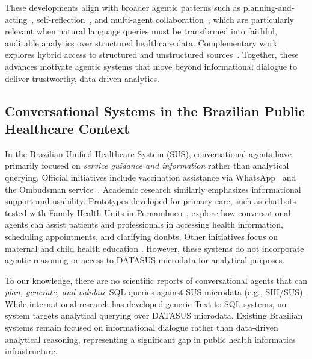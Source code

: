 \documentclass[sigconf,natbib=false]{acmart}
\begin{document}
These developments align with broader agentic patterns such as planning-and-acting~\cite{react2023}, self-reflection~\cite{reflexion2023}, and multi-agent collaboration~\cite{autogen2023,camel2023}, which are particularly relevant when natural language queries must be transformed into faithful, auditable analytics over structured healthcare data. Complementary work explores hybrid access to structured and unstructured sources~\cite{suql2024}. Together, these advances motivate agentic systems that move beyond informational dialogue to deliver trustworthy, data-driven analytics.


\subsection{Conversational Systems in the Brazilian Public Healthcare Context}
In the Brazilian Unified Healthcare System (SUS), conversational agents have primarily focused on \emph{service guidance and information} rather than analytical querying. Official initiatives include vaccination assistance via WhatsApp~\cite{ms_vax_chatbot_2023} and the Ombudsman service~\cite{ouvsus_chatbot_2024}. Academic research similarly emphasizes informational support and usability. Prototypes developed for primary care, such as chatbots tested with Family Health Units in Pernambuco~\cite{jhi_aps_chatbot_2024}, explore how conversational agents can assist patients and professionals in accessing health information, scheduling appointments, and clarifying doubts. Other initiatives focus on maternal and child health education \cite{xavier2021chatbot}. However, these systems do not incorporate agentic reasoning or access to DATASUS microdata for analytical purposes.

To our knowledge, there are no scientific reports of conversational agents that can \emph{plan, generate, and validate} SQL queries against SUS microdata (e.g., SIH/SUS). While international research has developed generic Text-to-SQL systems, no system targets analytical querying over DATASUS microdata. Existing Brazilian systems remain focused on informational dialogue rather than data-driven analytical reasoning, representing a significant gap in public health informatics infrastructure.
\end{document}

